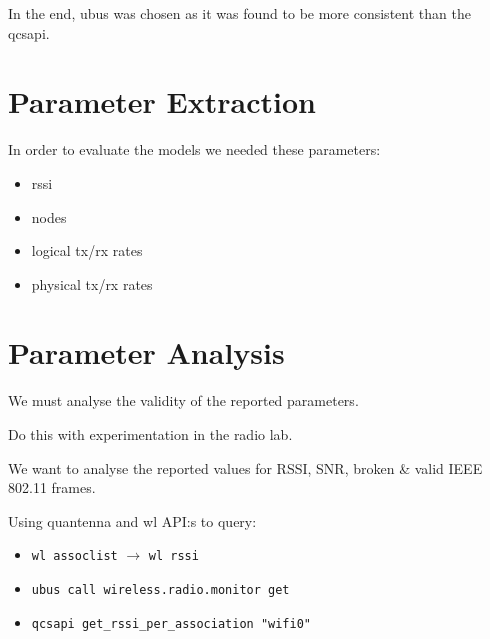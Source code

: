 In the end, ubus was chosen as it was found to be more consistent than the qcsapi.

\section{Parameter Extraction}

In order to evaluate the models we needed these parameters:

\begin{itemize}
\item rssi
\item nodes
\item logical tx/rx rates
\item physical tx/rx rates
\end{itemize}

\section{Parameter Analysis}

We must analyse the validity of the reported parameters.

Do this with experimentation in the radio lab.

We want to analyse the reported values for RSSI, SNR, broken \& valid IEEE 802.11 frames.

Using quantenna and wl API:s to query:
\begin{itemize}
    \item \texttt{wl assoclist} $\rightarrow$ \texttt{wl rssi}
    \item \texttt{ubus call wireless.radio.monitor get}
    \item \texttt{qcsapi get\_rssi\_per\_association "wifi0"}
\end{itemize}
